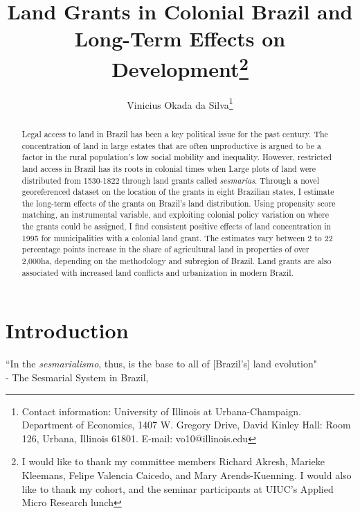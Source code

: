 \documentclass[11pt]{article}
\title{Land Grants in Colonial Brazil and Long-Term Effects on Development\thanks{I would like to thank my committee members  Richard Akresh, Marieke Kleemans, Felipe Valencia Caicedo, and Mary Arends-Kuenning. I would also like to thank my cohort, and the seminar participants at UIUC's Applied Micro Research lunch}}
\author{Vinicius Okada da Silva\thanks{Contact information: University of Illinois at Urbana-Champaign. Department of Economics, 1407 W. Gregory Drive, David Kinley Hall: Room 126, Urbana, Illinois 61801. E-mail: vo10@illinois.edu}}
\affil{Department of Economics, University of Illinois at Urbana-Champaign}
\date{}
\begin{document}
\maketitle
\thispagestyle{empty} 

\begin{abstract}
  Legal access to land in Brazil has been a key political issue for the past century. 
  The concentration of land in large estates that are often unproductive is argued to be a factor in the rural population's low social mobility and inequality. 
  However, restricted land access in Brazil has its roots in colonial times when Large plots of land were distributed from 1530-1822 through land grants called \textit{sesmarias}. 
  Through a novel georeferenced dataset on the location of the grants in eight Brazilian states, I estimate the long-term effects of the grants on Brazil's land distribution. 
  Using propensity score matching, an instrumental variable, and exploiting colonial policy variation on where the grants could be assigned, I find consistent positive effects of land concentration in 1995 for municipalities with a colonial land grant.
  The estimates vary between 2 to 22 percentage points increase in the share of agricultural land in properties of over 2,000ha, depending on the methodology and subregion of Brazil.
  Land grants are also associated with increased land conflicts and urbanization in modern Brazil.
\end{abstract}

\clearpage
{} 

\section{Introduction}

\begin{displayquote}
  ``In the \textit{sesmarialismo}, thus, is the base to all of [Brazil's] land evolution"
  \\ 
  \smallskip
  - The Sesmarial System in Brazil, \textcite[p.~25]{Da_Costa_Porto1979-dz}
  \end{displayquote}
\end{document}
